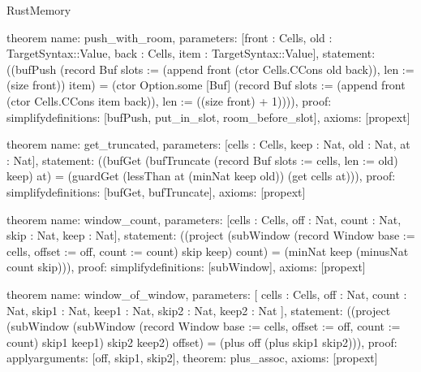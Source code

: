 \begin{lexlean}{RustMemory}
\begin{semanticmodule}
theorem{
  name: push_with_room,
  parameters: [front : Cells, old : TargetSyntax::Value, back : Cells, item : TargetSyntax::Value],
  statement: ((bufPush (record Buf {slots := (append front (ctor Cells.CCons old back)), len := (size front)}) item) = (ctor Option.some [Buf] (record Buf {slots := (append front (ctor Cells.CCons item back)), len := ((size front) + 1)}))),
  proof: simplify{definitions: [bufPush, put_in_slot, room_before_slot]},
  axioms: [propext]
}

theorem{
  name: get_truncated,
  parameters: [cells : Cells, keep : Nat, old : Nat, at : Nat],
  statement: ((bufGet (bufTruncate (record Buf {slots := cells, len := old}) keep) at) = (guardGet (lessThan at (minNat keep old)) (get cells at))),
  proof: simplify{definitions: [bufGet, bufTruncate]},
  axioms: [propext]
}

theorem{
  name: window_count,
  parameters: [cells : Cells, off : Nat, count : Nat, skip : Nat, keep : Nat],
  statement: ((project (subWindow (record Window {base := cells, offset := off, count := count}) skip keep) count) = (minNat keep (minusNat count skip))),
  proof: simplify{definitions: [subWindow]},
  axioms: [propext]
}

theorem{
  name: window_of_window,
  parameters: [
    cells : Cells,
    off : Nat,
    count : Nat,
    skip1 : Nat,
    keep1 : Nat,
    skip2 : Nat,
    keep2 : Nat
  ],
  statement: ((project (subWindow (subWindow (record Window {base := cells, offset := off, count := count}) skip1 keep1) skip2 keep2) offset) = (plus off (plus skip1 skip2))),
  proof: apply{arguments: [off, skip1, skip2], theorem: plus_assoc},
  axioms: [propext]
}
\end{semanticmodule}
\end{lexlean}
